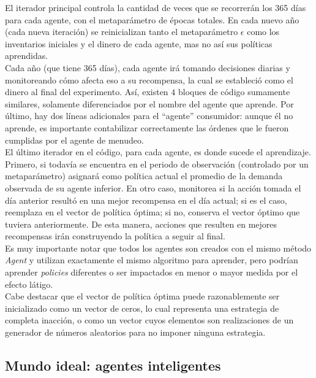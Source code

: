 El iterador principal controla la cantidad de veces que se recorrer\'an los 365 d\'ias para cada agente, con el metapar\'ametro de \'epocas totales. En cada nuevo a\~no (cada nueva iteraci\'on) se reinicializan tanto el metapar\'ametro $\epsilon$ como los inventarios iniciales y el dinero de cada agente, mas no as\'i sus pol\'iticas aprendidas.\\

Cada a\~no (que tiene 365 d\'ias), cada agente ir\'a tomando decisiones diarias y monitoreando c\'omo afecta eso a su recompensa, la cual se estableci\'o como el dinero al final del experimento. As\'i, existen $4$ bloques de c\'odigo sumamente similares, solamente diferenciados por el nombre del agente que aprende. Por \'ultimo, hay dos l\'ineas adicionales para el ``agente'' consumidor: aunque \'el no aprende, es importante contabilizar correctamente las \'ordenes que le fueron cumplidas por el agente de menudeo.\\

El \'ultimo iterador en el c\'odigo, para cada agente, es donde sucede el aprendizaje. Primero, si todav\'ia se encuentra en el periodo de observaci\'on (controlado por un metapar\'ametro) asignar\'a como pol\'itica actual el promedio de la demanda observada de su agente inferior. En otro caso, monitorea si la acci\'on tomada el d\'ia anterior result\'o en una mejor recompensa en el d\'ia actual; si es el caso, reemplaza en el vector de pol\'itica \'optima; si no, conserva el vector \'optimo que tuviera anteriormente. De esta manera, acciones que resulten en mejores recompensas ir\'an construyendo la pol\'itica a seguir al final.\\

Es muy importante notar que todos los agentes son creados con el mismo m\'etodo \textit{Agent} y utilizan exactamente el mismo algoritmo para aprender, pero podr\'ian aprender \textit{policies} diferentes o ser impactados en menor o mayor medida por el efecto l\'atigo.\\

Cabe destacar que el vector de pol\'itica \'optima puede razonablemente ser inicializado como un vector de ceros, lo cual representa una estrategia de completa inacci\'on, o como un vector cuyos elementos son realizaciones de un generador de n\'umeros aleatorios para no imponer ninguna estrategia.\\

\subsection{Mundo ideal: agentes inteligentes}

